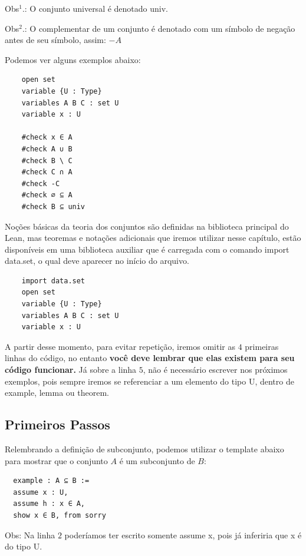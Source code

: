   Obs$^{1}$.: O conjunto universal é denotado { \selectfont univ}.

  Obs$^{2}$.: O complementar de um conjunto é denotado com um símbolo de negação antes de seu símbolo, assim: $-A$

  Podemos ver alguns exemplos abaixo:
  \begin{lstlisting}
    open set
    variable {U : Type}
    variables A B C : set U
    variable x : U

    #check x ∈ A
    #check A ∪ B
    #check B \ C
    #check C ∩ A
    #check -C
    #check ∅ ⊆ A
    #check B ⊆ univ \end{lstlisting}

  Noções básicas da teoria dos conjuntos são definidas na biblioteca principal do Lean, mas teoremas e notações adicionais que iremos utilizar nesse capítulo, estão disponíveis em uma biblioteca auxiliar que é carregada com o comando
  { \selectfont import data.set}, o qual deve aparecer no início do arquivo.

  \begin{lstlisting}
    import data.set
    open set
    variable {U : Type}
    variables A B C : set U
    variable x : U \end{lstlisting}

  A partir desse momento, para evitar repetição, iremos omitir as $4$ primeiras linhas do código, no entanto \textbf{você deve lembrar que elas existem para seu código funcionar.} Já sobre a linha $5$, não é necessário escrever nos próximos exemplos, pois sempre iremos se referenciar a um elemento do tipo{ \selectfont U}, dentro de {\selectfont example, lemma} ou {\selectfont theorem}.

  \subsection{Primeiros Passos}

  Relembrando a definição de subconjunto, podemos utilizar o template abaixo para mostrar que o conjunto $A$ é um subconjunto de $B$:

  \begin{lstlisting}
  example : A ⊆ B :=
  assume x : U,
  assume h : x ∈ A,
  show x ∈ B, from sorry \end{lstlisting}

  Obs: Na linha $2$ poderíamos ter escrito somente {\selectfont assume x}, pois já inferiria que {\selectfont x} é do tipo {\selectfont U}.

